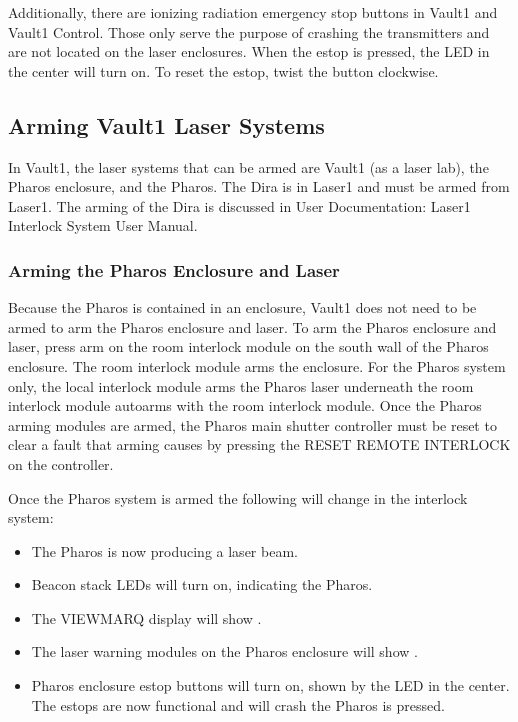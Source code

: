 \documentclass[letterpaper,10pt,english]{sphinxmanual}
\begin{document}
\sphinxAtStartPar
Additionally, there are ionizing radiation emergency stop buttons in Vault\sphinxhyphen{}1 and Vault\sphinxhyphen{}1 Control.
Those only serve the purpose of crashing the transmitters and are not located on the laser enclosures.
When the e\sphinxhyphen{}stop is pressed, the LED in the center will turn on.
To reset the e\sphinxhyphen{}stop, twist the button clockwise.


\subsection{Arming Vault\sphinxhyphen{}1 Laser Systems}
\label{\detokenize{user_documentation/Vault-1_laser:arming-vault-1-laser-systems}}
\sphinxAtStartPar
In Vault\sphinxhyphen{}1, the laser systems that can be armed are Vault\sphinxhyphen{}1 (as a laser lab), the Pharos enclosure, and the Pharos.
The Dira is in Laser\sphinxhyphen{}1 and must be armed from Laser\sphinxhyphen{}1.
The arming of the Dira is discussed in User Documentation: Laser\sphinxhyphen{}1 Interlock System User Manual.


\subsubsection{Arming the Pharos Enclosure and Laser}
\label{\detokenize{user_documentation/Vault-1_laser:arming-the-pharos-enclosure-and-laser}}
\sphinxAtStartPar
Because the Pharos is contained in an enclosure, Vault\sphinxhyphen{}1 does not need to be armed to arm the Pharos enclosure and laser.
To arm the Pharos enclosure and laser, press arm on the room interlock module on the south wall of the Pharos enclosure.
The room interlock module arms the enclosure.
For the Pharos system only, the local interlock module arms the Pharos laser underneath the room interlock module auto\sphinxhyphen{}arms with the room interlock module.
Once the Pharos arming modules are armed, the Pharos main shutter controller must be reset to clear a fault that arming causes by pressing the RESET REMOTE INTERLOCK on the controller.

\sphinxAtStartPar
Once the Pharos system is armed the following will change in the interlock system:
\begin{itemize}
\item {} 
\sphinxAtStartPar
The Pharos is now producing a laser beam.

\item {} 
\sphinxAtStartPar
Beacon stack  LEDs will turn on, indicating the Pharos.

\item {} 
\sphinxAtStartPar
The VIEWMARQ display will show .

\item {} 
\sphinxAtStartPar
The laser warning modules on the Pharos enclosure will show .

\item {} 
\sphinxAtStartPar
Pharos enclosure e\sphinxhyphen{}stop buttons will turn on, shown by the LED in the center. The e\sphinxhyphen{}stops are now functional and will crash the Pharos is pressed.

\end{itemize}
\end{document}
